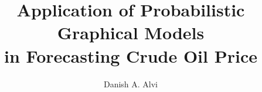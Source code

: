\documentclass{myclass}
\begin{document}

\title{\Large{Application of Probabilistic Graphical Models\\ \vspace{3mm}
				   in Forecasting Crude Oil Price}}
\author{Danish A. Alvi}


\maketitle




\newpage

\begin{frontmatter}



\tableofcontents

%

\end{frontmatter}

\pagestyle{headings}


\begin{onehalfspacing}





\end{onehalfspacing}


\printbibliography
\end{document}
